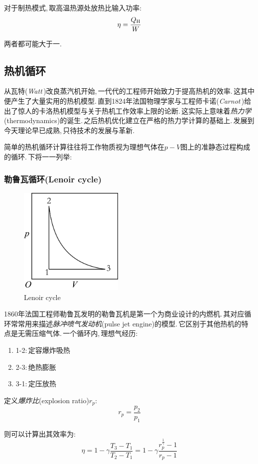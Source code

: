 对于制热模式,\,取高温热源处放热比输入功率:
\[\eta=\frac{Q_{\rm H}}{W}\]

两者都可能大于一.

\subsection{热机循环}
从瓦特({\it Watt}\,)改良蒸汽机开始,\,一代代的工程师开始致力于提高热机的效率.\,这其中便产生了大量实用的热机模型.\,直到1824年法国物理学家与工程师卡诺({\it Carnot}\,)给出了惊人的卡洛热机模型与关于热机工作效率上限的论断.\,这实际上意味着\emph{热力学}(thermodynamics)的诞生.\,之后热机优化建立在严格的热力学计算的基础上.\,发展到今天理论早已成熟,\,只待技术的发展与革新.

简单的热机循环计算往往将工作物质视为理想气体在$p-V$图上的准静态过程构成的循环.\,下将一一列举:
\subsubsection{\hei 勒鲁瓦循环(Lenoir cycle)}
\begin{figure}
\centering
\includegraphics[width=5cm]{image/5-2-6.png}
\caption{Lenoir cycle}
\end{figure}
1860年法国工程师勒鲁瓦发明的勒鲁瓦机是第一个为商业设计的内燃机.\,其对应循环常常用来描述\emph{脉冲喷气发动机}(pulse jet engine)的模型.\,它区别于其他热机的特点是无需压缩气体.\,一个循环内,\,理想气经历:
\begin{enumerate}[i]
	\item 1-2:\,定容爆炸吸热
	\item 2-3:\,绝热膨胀
	\item 3-1:\,定压放热
\end{enumerate}

定义\emph{爆炸比}(explosion ratio)$r_p$:
\[r_p=\frac{p_2}{p_1}\]

则可以计算出其效率为:
\[\eta=1-\gamma\frac{T_3-T_1}{T_2-T_1}=1-\gamma\frac{r_p^{\frac{1}{\gamma}}-1}{r_p-1}\]
